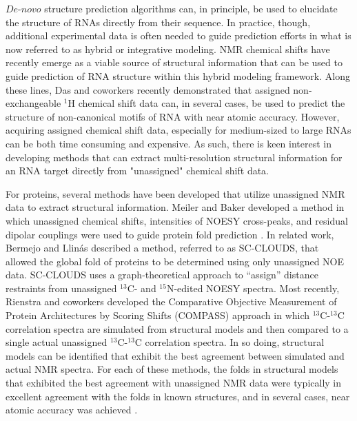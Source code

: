 \documentclass[journal=jcisd8,manuscript=article,layout=onecolumn]{achemso}
\begin{document}
$\textit{De-novo}$ structure prediction algorithms can, in principle, be used to elucidate the structure of RNAs directly from their sequence. In practice, though, additional experimental data is often needed to guide prediction efforts in what is now referred to as hybrid or integrative modeling\cite{burke2012structure, lee2016integrative}. NMR chemical shifts have recently emerge as a viable source of structural information that can be used to guide prediction of RNA structure within this hybrid modeling framework. Along these lines, Das and coworkers recently demonstrated that assigned non-exchangeable $^{1}$H chemical shift  data can, in several cases, be used to predict the structure of non-canonical motifs of RNA with near atomic accuracy\cite{sripakdeevong2014structure}. However, acquiring assigned chemical shift data, especially for medium-sized to large RNAs can be both time consuming and expensive. As such, there is keen interest in developing methods that can extract multi-resolution structural information for an RNA target directly from "unassigned" chemical shift data.

For proteins, several methods have been developed that utilize unassigned NMR data to extract structural information. Meiler and Baker developed a method in which unassigned chemical shifts, intensities of NOESY cross-peaks, and residual dipolar couplings were used to guide protein fold prediction \cite{meiler2003rapid}. In related work, Bermejo and Llin{\'a}s described a method, referred to as SC-CLOUDS, that allowed the global fold of proteins to be determined using only unassigned NOE data. SC-CLOUDS uses a graph-theoretical approach to ``assign'' distance restraints from unassigned $^{13}$C- and $^{15}$N-edited NOESY spectra\cite{bermejo2008deuterated}. Most recently, Rienstra and coworkers developed the Comparative Objective Measurement of Protein Architectures by Scoring Shifts (COMPASS) approach in which $^{13}$C-$^{13}$C correlation spectra are simulated from structural models and then compared to a single actual unassigned  $^{13}$C-$^{13}$C correlation spectra\cite{courtney2015experimental}. In so doing, structural models can be identified that exhibit the best agreement between simulated and actual NMR spectra. For each of these methods, the folds in structural models that exhibited the best agreement with unassigned NMR data were typically in excellent agreement with the folds in known structures, and in several cases, near atomic accuracy was achieved \cite{meiler2003rapid, courtney2015experimental}. 
\end{document}
